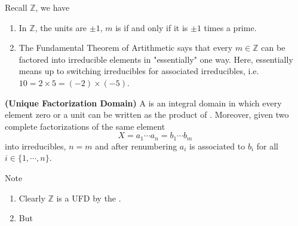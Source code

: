 \documentclass{article}
\newcommand{\bfs}[1]{\textbf{({#1}) }}
\begin{document}
\begin{exma}Recall $\mathbb{Z}$, we have
\begin{enumerate}
    \item In $\mathbb{Z}$, the units are $\pm 1$, $m$ is  if and only if it is $\pm 1$ times a prime.
    \item The Fundamental Theorem of Artithmetic says that every $m \in \mathbb{Z}$ can be factored into irreducible elements in "essentially" one way. Here, essentially means up to switching irreducibles for associated irreducibles, i.e. $10=2 \times 5=(-2) \times(-5)$. 
\end{enumerate}
\end{exma}
\begin{defa}\bfs{Unique Factorization Domain}
A  is an integral domain in which every element  zero or a unit can be written as the product of . Moreover, given two complete factorizations of the same element
$$
X=a_{1} \cdots a_{n}=b_{1} \cdots b_{m}
$$
into irreducibles, $n=m$ and after renumbering $a_{i}$ is associated to $b_{i}$ for all $i \in\{1, \cdots, n\}$.
\end{defa}
\begin{rema}Note
\begin{enumerate}
    \item Clearly $\mathbb{Z}$ is a UFD by the .
    \item  But 
\end{enumerate}
\end{rema}
\end{document}
